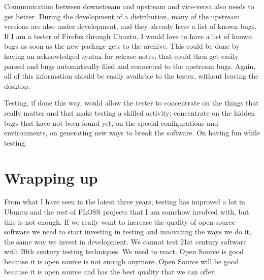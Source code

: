 Communication between downstream and upstream and vice-versa also needs to get
better. During the development of a distribution, many of the upstream versions
are also under development, and they already have a list of known bugs. If I am
a tester of Firefox through Ubuntu, I would love to have a list of known bugs as
soon as the new package gets to the archive. This could be done by having an
acknowledged syntax for release notes, that could then get easily parsed and
bugs automatically filed and connected to the upstream bugs. Again, all of this
information should be easily available to the tester, without leaving the
desktop.

Testing, if done this way, would allow the tester to concentrate on the things
that really matter and that make testing a skilled activity; concentrate on the
hidden bugs that have not been found yet, on the special configurations and
environments, on generating new ways to break the software. On having fun while
testing.

\section*{Wrapping up}

From what I have seen in the latest three years, testing has improved a lot in
Ubuntu and the rest of FLOSS projects that I am somehow involved with, but this
is not enough. If we really want to increase the quality of open source software
we need to start investing in testing and innovating the ways we do it, the same
way we invest in development. We cannot test 21st century software with 20th
century testing techniques. We need to react. Open Source is good because it is
open source is not enough anymore. Open Source will be good because it is open
source and has the best quality that we can offer.
